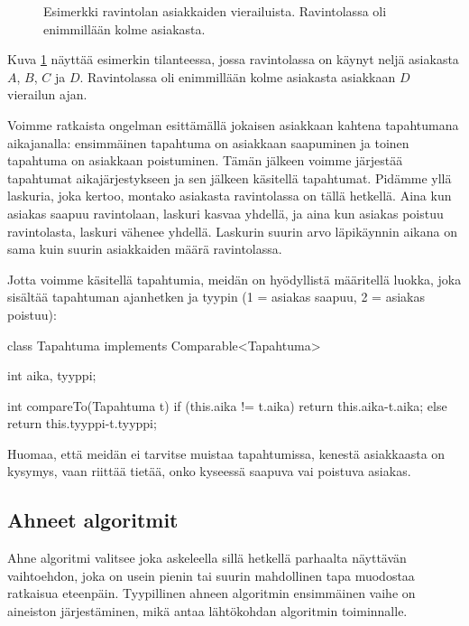 \begin{figure}
\center
{}
\caption{Esimerkki ravintolan asiakkaiden vierailuista.
Ravintolassa oli enimmillään kolme asiakasta.}
\label{fig:pyyvii}
\end{figure}

Kuva \ref{fig:pyyvii} näyttää esimerkin tilanteessa,
jossa ravintolassa on käynyt neljä asiakasta $A$, $B$, $C$ ja $D$.
Ravintolassa oli enimmillään kolme asiakasta
asiakkaan $D$ vierailun ajan.

Voimme ratkaista ongelman esittämällä jokaisen asiakkaan kahtena
tapahtumana aikajanalla: ensimmäinen tapahtuma on asiakkaan
saapuminen ja toinen tapahtuma on asiakkaan poistuminen.
Tämän jälkeen voimme järjestää tapahtumat aikajärjestykseen
ja sen jälkeen käsitellä tapahtumat.
Pidämme yllä laskuria, joka kertoo, montako asiakasta ravintolassa
on tällä hetkellä.
Aina kun asiakas saapuu ravintolaan, laskuri kasvaa yhdellä,
ja aina kun asiakas poistuu ravintolasta,
laskuri vähenee yhdellä.
Laskurin suurin arvo läpikäynnin aikana on sama kuin
suurin asiakkaiden määrä ravintolassa.

Jotta voimme käsitellä tapahtumia, meidän on hyödyllistä määritellä
luokka, joka sisältää tapahtuman ajanhetken ja tyypin
(1 = asiakas saapuu, 2 = asiakas poistuu):

\begin{code}
class Tapahtuma implements Comparable<Tapahtuma> {
    int aika, tyyppi;

    int compareTo(Tapahtuma t) {
        if (this.aika != t.aika) return this.aika-t.aika;
        else return this.tyyppi-t.tyyppi;
    }
}
\end{code}

Huomaa, että meidän ei tarvitse muistaa tapahtumissa,
kenestä asiakkaasta on kysymys, vaan riittää tietää,
onko kyseessä saapuva vai poistuva asiakas.

\subsection{Ahneet algoritmit}

Ahne algoritmi valitsee joka askeleella sillä hetkellä parhaalta
näyttävän vaihtoehdon, joka on usein pienin tai suurin mahdollinen
tapa muodostaa ratkaisua eteenpäin.
Tyypillinen ahneen algoritmin ensimmäinen vaihe on aineiston
järjestäminen, mikä antaa lähtökohdan algoritmin toiminnalle.

